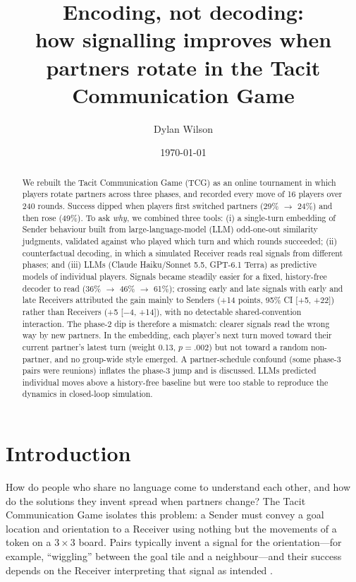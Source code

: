 \documentclass[11pt]{article}
\title{Encoding, not decoding:\\how signalling improves when partners rotate in the Tacit Communication Game}
\author{Dylan Wilson}
\date{\today}
\begin{document}
\maketitle

\begin{abstract}
We rebuilt the Tacit Communication Game (TCG) as an online tournament in which players rotate partners across three phases, and recorded every move of 16 players over 240 rounds. Success dipped when players first switched partners (29\% $\rightarrow$ 24\%) and then rose (49\%). To ask \emph{why}, we combined three tools: (i) a single-turn embedding of Sender behaviour built from large-language-model (LLM) odd-one-out similarity judgments, validated against who played which turn and which rounds succeeded; (ii) counterfactual decoding, in which a simulated Receiver reads real signals from different phases; and (iii) LLMs (Claude Haiku/Sonnet 5.5, GPT-6.1 Terra) as predictive models of individual players. Signals became steadily easier for a fixed, history-free decoder to read (36\% $\rightarrow$ 46\% $\rightarrow$ 61\%); crossing early and late signals with early and late Receivers attributed the gain mainly to Senders (+14 points, 95\% CI [+5, +22]) rather than Receivers (+5 [$-$4, +14]), with no detectable shared-convention interaction. The phase-2 dip is therefore a mismatch: clearer signals read the wrong way by new partners. In the embedding, each player's next turn moved toward their current partner's latest turn (weight 0.13, $p=.002$) but not toward a random non-partner, and no group-wide style emerged. A partner-schedule confound (some phase-3 pairs were reunions) inflates the phase-3 jump and is discussed. LLMs predicted individual moves above a history-free baseline but were too stable to reproduce the dynamics in closed-loop simulation.
\end{abstract}

\section{Introduction}
How do people who share no language come to understand each other, and how do the solutions they invent spread when partners change? The Tacit Communication Game \citep{deruiter2010} isolates this problem: a Sender must convey a goal location and orientation to a Receiver using nothing but the movements of a token on a $3\times3$ board. Pairs typically invent a signal for the orientation---for example, ``wiggling'' between the goal tile and a neighbour---and their success depends on the Receiver interpreting that signal as intended \citep{stolk2013,stolk2016}.
\end{document}
